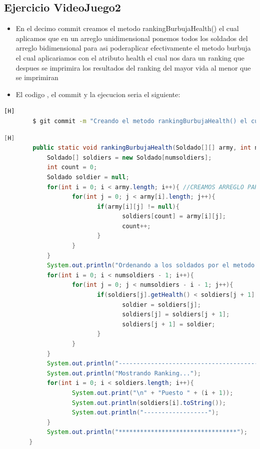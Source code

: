 \documentclass{article}
\begin{document}
	\subsection{Ejercicio VideoJuego2}
	\begin{itemize}	
		\item En el decimo commit creamos el metodo rankingBurbujaHealth() el cual aplicamos que en un arreglo unidimensional ponemos todos los soldados del arreglo bidimensional para asi poderaplicar efectivamente el metodo burbuja el cual aplicariamos con el atributo health el cual nos dara un ranking que despues se imprimira los resultados del ranking del mayor vida al menor que se imprimiran 
		\item El codigo , el commit y la ejecucion seria el siguiente:
	\end{itemize}	
	\begin{lstlisting}[language=bash,caption={Commit}][H]
		$ git commit -m "Creando el metodo rankingBurbujaHealth() el cual aplicamos que en un arreglo unidimensional ponemos todos los soldados del arreglo bidimensional para asi poderaplicar efectivamente el metodo burbuja el cual aplicariamos con el atributo health el cual nos dara un ranking que despues se imprimira los resultados del ranking del mayor vida al menor"
	\end{lstlisting}	
	\begin{lstlisting}[language=java,caption={Las lineas de codigos del metodo creado:}][H]
		public static void rankingBurbujaHealth(Soldado[][] army, int numsoldiers){
			Soldado[] soldiers = new Soldado[numsoldiers];
			int count = 0;
			Soldado soldier = null;
			for(int i = 0; i < army.length; i++){ //CREAMOS ARREGLO PARA QUE LOS SOLDADOS SE TRASLADEN DE UN ARREGLO BIDIMENSIONAL A UNO DIMENSIONAL PARA APLICAR EL METODO BURBUJA
				   for(int j = 0; j < army[i].length; j++){
						  if(army[i][j] != null){
								 soldiers[count] = army[i][j];
								 count++;
						  }
				   }
			}
			System.out.println("Ordenando a los soldados por el metodo burbuja: "); //APLICAMOS EL METODO BURBUJA CON LOS PUNTOS DE VIDA
			for(int i = 0; i < numsoldiers - 1; i++){
				   for(int j = 0; j < numsoldiers - i - 1; j++){
						  if(soldiers[j].getHealth() < soldiers[j + 1].getHealth()){
								 soldier = soldiers[j];
								 soldiers[j] = soldiers[j + 1];
								 soldiers[j + 1] = soldier;
						  }
				   }      
			}
			System.out.println("------------------------------------------");
			System.out.println("Mostrando Ranking...");
			for(int i = 0; i < soldiers.length; i++){
				   System.out.print("\n" + "Puesto " + (i + 1));
				   System.out.println(soldiers[i].toString());
				   System.out.println("------------------");
			}
			System.out.println("*********************************");
	   } 
	\end{lstlisting}
\end{document}
